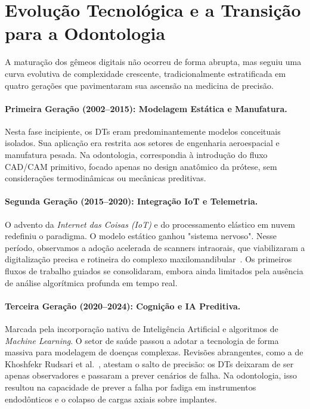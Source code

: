\section{Evolução Tecnológica e a Transição para a Odontologia}

A maturação dos gêmeos digitais não ocorreu de forma abrupta, mas seguiu uma curva evolutiva de complexidade crescente, tradicionalmente estratificada em quatro gerações que pavimentaram sua ascensão na medicina de precisão.

\paragraph{Primeira Geração (2002--2015): Modelagem Estática e Manufatura.} 
Nesta fase incipiente, os DTs eram predominantemente modelos conceituais isolados. Sua aplicação era restrita aos setores de engenharia aeroespacial e manufatura pesada. Na odontologia, correspondia à introdução do fluxo CAD/CAM primitivo, focado apenas no design anatômico da prótese, sem considerações termodinâmicas ou mecânicas preditivas.

\paragraph{Segunda Geração (2015--2020): Integração IoT e Telemetria.} 
O advento da \textit{Internet das Coisas (IoT)} e do processamento elástico em nuvem redefiniu o paradigma. O modelo estático ganhou "sistema nervoso". Nesse período, observamos a adoção acelerada de scanners intraorais, que viabilizaram a digitalização precisa e rotineira do complexo maxilomandibular~\cite{mormann2004cerec}. Os primeiros fluxos de trabalho guiados se consolidaram, embora ainda limitados pela ausência de análise algorítmica profunda em tempo real.

\paragraph{Terceira Geração (2020--2024): Cognição e IA Preditiva.} 
Marcada pela incorporação nativa de Inteligência Artificial e algoritmos de \textit{Machine Learning}. O setor de saúde passou a adotar a tecnologia de forma massiva para modelagem de doenças complexas. Revisões abrangentes, como a de Khoshfekr Rudsari et al.~\cite{khoshfekr2025digital}, atestam o salto de precisão: os DTs deixaram de ser apenas observadores e passaram a prever cenários de falha. Na odontologia, isso resultou na capacidade de prever a falha por fadiga em instrumentos endodônticos e o colapso de cargas axiais sobre implantes.

